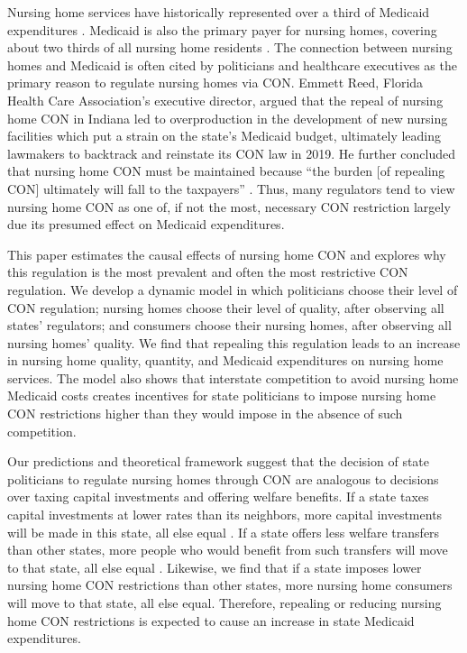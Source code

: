 \documentclass[../Main.tex]{subfiles}
\begin{document}
Nursing home services have historically represented over a third of Medicaid expenditures \citep{wiener1999controlling}. Medicaid is also the primary payer for nursing homes, covering about two thirds of all nursing home residents . The connection between nursing homes and Medicaid is often cited by politicians and healthcare executives as the primary reason to regulate nursing homes via CON. Emmett Reed, Florida Health Care Association’s executive director, argued that the repeal of nursing home CON in Indiana led to overproduction in the development of new nursing facilities which put a strain on the state’s Medicaid budget, ultimately leading lawmakers to backtrack and reinstate its CON law in 2019. He further concluded that nursing home CON must be maintained because “the burden [of repealing CON] ultimately will fall to the taxpayers” \citep{sexton2019conrepeal}. Thus, many regulators tend to view nursing home CON as one of, if not the most, necessary CON restriction largely due its presumed effect on Medicaid expenditures.

This paper estimates the causal effects of nursing home CON and explores why this regulation is the most prevalent and often the most restrictive CON regulation. We develop a dynamic model in which politicians choose their level of CON regulation; nursing homes choose their level of quality, after observing all states' regulators; and consumers choose their nursing homes, after observing all nursing homes' quality. We find that repealing this regulation leads to an increase in nursing home quality, quantity, and Medicaid expenditures on nursing home services. The model also shows that interstate competition to avoid nursing home Medicaid costs creates incentives for state politicians to impose nursing home CON restrictions higher than they would impose in the absence of such competition. 

Our predictions and theoretical framework suggest that the decision of state politicians to regulate nursing homes through CON are analogous to decisions over taxing capital investments and offering welfare benefits. If a state taxes capital investments at lower rates than its neighbors, more capital investments will be made in this state, all else equal \citep{zodrow1986pigou,bucovetsky1991asymmetric, kanbur1993jeux, basinger2004remodeling, plumper2009there}. If a state offers less welfare transfers than other states, more people who would benefit from such transfers will move to that state, all else equal \citep{gramlich1984migration, peterson1989american, saavedra2000model}. Likewise, we find that if a state imposes lower nursing home CON restrictions than other states, more nursing home consumers will move to that state, all else equal. Therefore, repealing or reducing nursing home CON restrictions is expected to cause an increase in state Medicaid expenditures.
\end{document}
